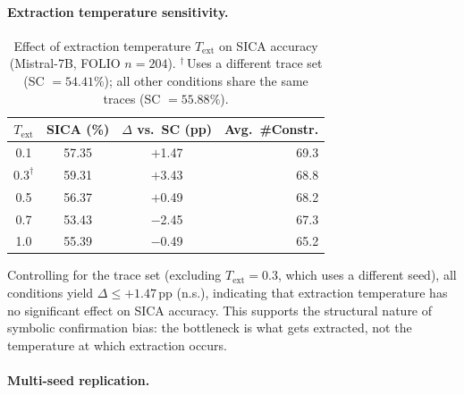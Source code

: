 \paragraph{Extraction temperature sensitivity.}
\label{app:text-sensitivity}

\begin{table}[h]
\centering
\small
\caption{Effect of extraction temperature $T_{\text{ext}}$ on SICA accuracy (Mistral-7B, FOLIO $n{=}204$). $^\dagger$\,Uses a different trace set (SC $= 54.41\%$); all other conditions share the same traces (SC $= 55.88\%$).}
\label{tab:text-sensitivity}
\begin{tabular}{@{}cccr@{}}
\toprule
$T_{\text{ext}}$ & SICA (\%) & $\Delta$ vs.\ SC (pp) & Avg.\ \#Constr. \\
\midrule
0.1 & 57.35 & $+$1.47 & 69.3 \\
$0.3^\dagger$ & 59.31 & $+$3.43 & 68.8 \\
0.5 & 56.37 & $+$0.49 & 68.2 \\
0.7 & 53.43 & $-$2.45 & 67.3 \\
1.0 & 55.39 & $-$0.49 & 65.2 \\
\bottomrule
\end{tabular}
\end{table}

Controlling for the trace set (excluding $T_{\text{ext}} = 0.3$, which uses a different seed), all conditions yield $\Delta \leq +1.47$\,pp (n.s.), indicating that extraction temperature has no significant effect on SICA accuracy. This supports the structural nature of symbolic confirmation bias: the bottleneck is what gets extracted, not the temperature at which extraction occurs.

\paragraph{Multi-seed replication.}
\label{app:multi-seed}

